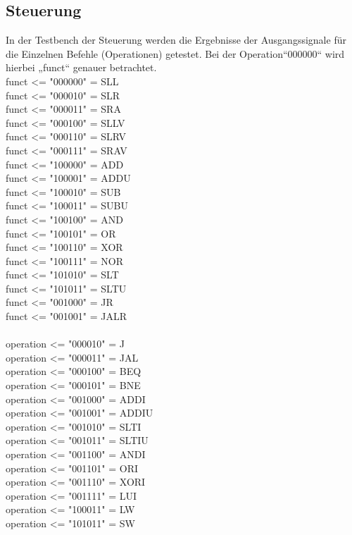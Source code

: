 \documentclass[11pt]{article} %
\begin{document}
\subsection{Steuerung}
In der Testbench der Steuerung werden die Ergebnisse der Ausgangssignale für die Einzelnen Befehle (Operationen) getestet. Bei der Operation“000000“ wird hierbei „funct“ genauer betrachtet.\\
funct <= "000000"  = SLL\\
funct <= "000010" = SLR\\
funct <= "000011" = SRA\\
funct <= "000100" = SLLV\\
funct <= "000110" = SLRV\\
funct <= "000111" = SRAV\\
funct <= "100000" = ADD\\
funct <= "100001" = ADDU\\
funct <= "100010" = SUB\\
funct <= "100011" = SUBU\\
funct <= "100100" = AND\\
funct <= "100101" = OR\\
funct <= "100110" = XOR\\
funct <= "100111" = NOR\\
funct <= "101010" = SLT\\
funct <= "101011" = SLTU\\
funct <= "001000" = JR\\
funct <= "001001" = JALR\\
\newpage\\
operation <= "000010" = J\\
operation <= "000011" = JAL\\
operation <= "000100" = BEQ\\
operation <= "000101" = BNE\\
operation <= "001000" = ADDI\\
operation <= "001001" = ADDIU\\
operation <= "001010" = SLTI\\
operation <= "001011" = SLTIU\\
operation <= "001100" = ANDI\\
operation <= "001101" = ORI\\
operation <= "001110" = XORI\\
operation <= "001111" = LUI\\
operation <= "100011" = LW\\
operation <= "101011" = SW\\
\end{document}
